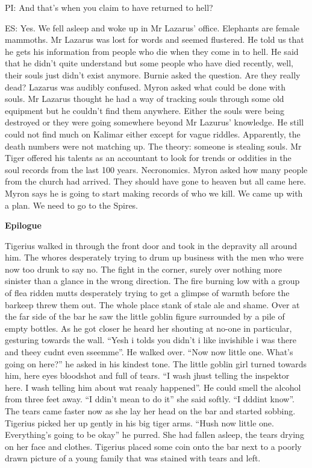 PI: And that’s when you claim to have returned to hell?\medskip

ES: Yes. We fell asleep and woke up in Mr Lazarus’ office. Elephants are female mammoths. Mr Lazarus was lost for words and seemed flustered. He told us that he gets his information from people who die when they come in to hell. He said that he didn’t quite understand but some people who have died recently, well, their souls just didn’t exist anymore. Burnie asked the question. Are they really dead? Lazarus was audibly confused. Myron asked what could be done with souls. Mr Lazarus thought he had a way of tracking souls through some old equipment but he couldn’t find them anywhere. Either the souls were being destroyed or they were going somewhere beyond Mr Lazurus’ knowledge. He still could not find much on Kalimar either except for vague riddles. Apparently, the death numbers were not matching up. The theory: someone is stealing souls. Mr Tiger offered his talents as an accountant to look for trends or oddities in the soul records from the last 100 years. Necronomics. Myron asked how many people from the church had arrived. They should have gone to heaven but all came here. Myron says he is going to start making records of who we kill. We came up with a plan. We need to go to the Spires.\medskip

\textbf{Epilogue}\medskip

Tigerius walked in through the front door and took in the depravity all around him. The whores desperately trying to drum up business with the men who were now too drunk to say no. The fight in the corner, surely over nothing more sinister than a glance in the wrong direction. The fire burning low with a group of flea ridden mutts desperately trying to get a glimpse of warmth before the barkeep threw them out. The whole place stank of stale ale and shame. Over at the far side of the bar he saw the little goblin figure surrounded by a pile of empty bottles. As he got closer he heard her shouting at no-one in particular, gesturing towards the wall. “Yesh i tolds you didn’t i like invishible i was there and theey cudnt even sseemme”. He walked over. “Now now little one. What’s going on here?” he asked in his kindest tone. The little goblin girl turned towards him, here eyes bloodshot and full of tears. “I wash jhust telling the inspektor here. I wash telling him about wat reaaly happened”. He could smell the alcohol from three feet away. “I ddin’t mean to do it” she said softly. “I dddint know”. The tears came faster now as she lay her head on the bar and started sobbing. Tigerius picked her up gently in his big tiger arms. “Hush now little one. Everything’s going to be okay” he purred. She had fallen asleep, the tears drying on her face and clothes. Tigerius placed some coin onto the bar next to a poorly drawn picture of a young family that was stained with tears and left.\medskip

%

\clearpage
